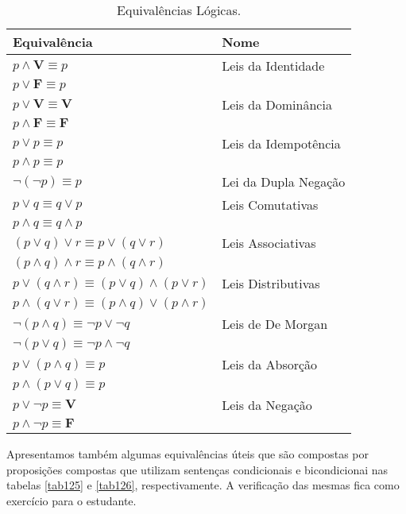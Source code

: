 \begin{table}[H]
	\centering
	\begin{tabular}{|l|l|}%
	\toprule
	\textbf{Equivalência} & \textbf{Nome}\\
	\midrule
	$p \land \textbf{V} \equiv p$ &	Leis da Identidade\\
	$p \lor \textbf{F} \equiv p$ &	\\
	\midrule
	$p \lor \textbf{V} \equiv \textbf{V}$ &	Leis da Dominância\\
	$p \land \textbf{F} \equiv \textbf{F}$ &\\
	\midrule
	$p \lor p \equiv p$ &	Leis da Idempotência\\
	$p \land p \equiv p$ &	\\
	\midrule
	$\lnot (\lnot p) \equiv p$ & Lei da Dupla Negação\\
	\midrule
	$p \lor q \equiv q \lor p$ & Leis Comutativas\\
	$p \land q \equiv q \land p$ &\\
	\midrule
	$(p \lor q) \lor r \equiv p \lor (q \lor r)$ & Leis Associativas\\
	$(p \land q) \land r \equiv p \land (q \land r)$ &\\
	\midrule
	$p \lor (q \land r) \equiv (p \lor q) \land (p \lor r)$ & Leis Distributivas \\
	$p \land (q \lor r) \equiv (p \land q) \lor (p \land r)$ & \\
	\midrule
	$\lnot (p \land q) \equiv \lnot p \lor \lnot q$ & Leis de De Morgan\\
	$\lnot (p \lor q) \equiv \lnot p \land \lnot q$ &\\
	\midrule
	$p \lor (p \land q) \equiv p$ & Leis da Absorção\\
	$p \land (p \lor q) \equiv p$ &\\
	\midrule
	$p \lor \lnot p \equiv \textbf{V}$ & Leis da Negação\\
	$p \land \lnot p \equiv \textbf{F}$ &	\\
	\bottomrule%
	\end{tabular}%
	\caption{Equivalências Lógicas.}
	\label{tab124}
\end{table}

Apresentamos também algumas equivalências úteis que são compostas por
proposições compostas que utilizam sentenças condicionais e bicondicionai nas
tabelas \ref{tab125} e \ref{tab126}, respectivamente. A verificação das
mesmas fica como exercício para o estudante.

